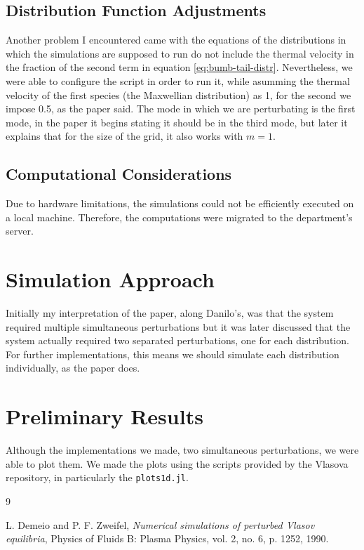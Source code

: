 \documentclass[a4paper]{article}
\begin{document}
    \subsection{Distribution Function Adjustments}            
        Another problem I encountered came with the equations of the distributions in which the simulations are supposed to run do not include the thermal velocity in the fraction of the second term in equation \eqref{eq:bumb-tail-distr}.  
        Nevertheless, we were able to configure the script in order to run it, while asumming the thermal velocity of the first species (the Maxwellian distribution) as 1, for the second we impose 0.5, as the paper said. 
        The mode in which we are perturbating is the first mode, in the paper it begins stating it should be in the third mode, but later it explains that for the size of the grid, it also works with $m=1$.
    
    \subsection{Computational Considerations}
    Due to hardware limitations, the simulations could not be efficiently executed on a local machine. Therefore, the computations were migrated to the department's server.

\section{Simulation Approach}
Initially my interpretation of the paper, along Danilo's, was that the system required multiple simultaneous perturbations but it was later discussed that the system actually required two separated perturbations, one for each distribution. 
For further implementations, this means we should simulate each distribution individually, as the paper does.

\section{Preliminary Results}
Although the implementations we made, two simultaneous perturbations, we were able to plot them.  
We made the plots using the scripts provided by the Vlasova repository, in particularly the \texttt{plots1d.jl}.
    
\begin{thebibliography}{9}

L. Demeio and P. F. Zweifel,
\textit{Numerical simulations of perturbed Vlasov equilibria},
Physics of Fluids B: Plasma Physics, vol. 2, no. 6, p. 1252, 1990.

\end{thebibliography}
\end{document}
